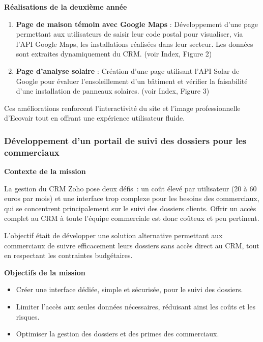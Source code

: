 \textbf{Réalisations de la deuxième année}\vspace{0.3cm}

\begin{enumerate}
    \item \textbf{Page de maison témoin avec Google Maps} : Développement d’une page permettant aux utilisateurs de saisir leur code postal pour visualiser, via l’API Google Maps, les installations réalisées dans leur secteur. Les données sont extraites dynamiquement du CRM. (voir Index, Figure 2)\vspace{0.3cm}
    \item \textbf{Page d’analyse solaire} : Création d’une page utilisant l’API Solar de Google pour évaluer l’ensoleillement d’un bâtiment et vérifier la faisabilité d’une installation de panneaux solaires. (voir Index, Figure 3)\vspace{0.3cm}
\end{enumerate}

Ces améliorations renforcent l’interactivité du site et l’image professionnelle d’Ecovair tout en offrant une expérience utilisateur fluide.

\subsubsection{Développement d’un portail de suivi des dossiers pour les commerciaux}

\textbf{Contexte de la mission}\vspace{0.3cm}

La gestion du CRM Zoho pose deux défis~: un coût élevé par utilisateur (20 à 60 euros par mois) et une interface trop complexe pour les besoins des commerciaux, qui se concentrent principalement sur le suivi des dossiers clients. Offrir un accès complet au CRM à toute l’équipe commerciale est donc coûteux et peu pertinent.

L’objectif était de développer une solution alternative permettant aux commerciaux de suivre efficacement leurs dossiers sans accès direct au CRM, tout en respectant les contraintes budgétaires.\vspace{0.3cm}

\textbf{Objectifs de la mission}\vspace{0.3cm}

\begin{itemize}
    \item Créer une interface dédiée, simple et sécurisée, pour le suivi des dossiers.\vspace{0.3cm}
    \item Limiter l’accès aux seules données nécessaires, réduisant ainsi les coûts et les risques.\vspace{0.3cm}
    \item Optimiser la gestion des dossiers et des primes des commerciaux.\vspace{0.3cm}
\end{itemize}

